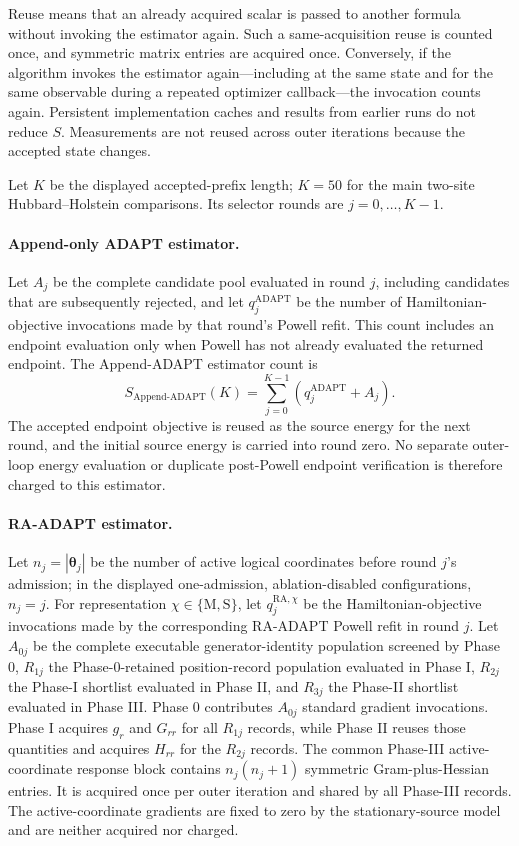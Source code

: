 \documentclass[
  reprint,
  amsmath,
  amssymb,
  aps,
  pra,
  nofootinbib,
  superscriptaddress,
  floatfix
]{revtex4-2}
\begin{document}
Reuse means that an already acquired scalar is passed to another formula
without invoking the estimator again. Such a same-acquisition reuse is counted
once, and symmetric matrix entries are acquired once. Conversely, if the
algorithm invokes the estimator again---including at the same state and for
the same observable during a repeated optimizer callback---the invocation
counts again. Persistent implementation caches and results from earlier runs
do not reduce \(S\). Measurements are not reused across outer
iterations because the accepted state changes.

Let \(K\) be the displayed accepted-prefix length; \(K=50\) for the main
two-site Hubbard--Holstein comparisons. Its selector rounds are
\(j=0,\ldots,K-1\).

\paragraph*{Append-only ADAPT estimator.}
Let \(A_j\) be the complete candidate pool evaluated in round \(j\), including
candidates that are subsequently rejected, and let
\(q_j^{\mathrm{ADAPT}}\) be the number of Hamiltonian-objective invocations
made by that round's Powell refit. This count includes an endpoint evaluation
only when Powell has not already evaluated the returned endpoint. The
Append-ADAPT estimator count is
\begin{equation}
S_{\mathrm{Append\text{-}ADAPT}}(K)
=
\sum_{j=0}^{K-1}
\left(q_j^{\mathrm{ADAPT}}+A_j\right).
\label{eq:appendix_s_append}
\end{equation}
The accepted endpoint objective is reused as the source energy for the next
round, and the initial source energy is carried into round zero. No separate
outer-loop energy evaluation or duplicate post-Powell endpoint verification is
therefore charged to this estimator.

\paragraph*{RA-ADAPT estimator.}
Let \(n_j=|\boldsymbol\theta_j|\) be the number of active logical coordinates
before round \(j\)'s admission; in the displayed one-admission,
ablation-disabled configurations, \(n_j=j\). For representation
\(\chi\in\{\mathrm M,\mathrm S\}\), let
\(q_j^{\mathrm{RA},\chi}\) be the Hamiltonian-objective invocations made by
the corresponding RA-ADAPT Powell refit in round \(j\). Let \(A_{0j}\) be the complete
executable generator-identity population screened by Phase 0, \(R_{1j}\) the
Phase-0-retained position-record population evaluated in Phase I, \(R_{2j}\)
the Phase-I shortlist evaluated in Phase II, and \(R_{3j}\) the Phase-II
shortlist evaluated in Phase III. Phase 0 contributes \(A_{0j}\) standard
gradient invocations. Phase I acquires \(g_r\) and \(G_{rr}\) for all
\(R_{1j}\) records, while Phase II reuses those quantities and acquires
\(H_{rr}\) for the \(R_{2j}\) records. The common Phase-III active-coordinate
response block contains \(n_j(n_j+1)\) symmetric Gram-plus-Hessian entries. It
is acquired once per outer iteration and shared by all Phase-III records. The
active-coordinate gradients are fixed to zero by the stationary-source model
and are neither acquired nor charged.
\end{document}
